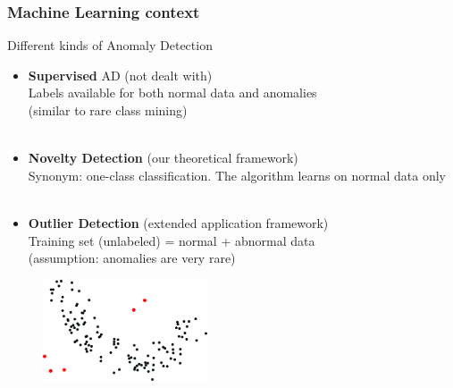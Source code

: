 \documentclass[9pt]{beamer}
\newcommand\red{\color{red} }
\begin{document}
\begin{frame}
\frametitle{Machine Learning context}
\begin{block}{Different kinds of Anomaly Detection}
\begin{itemize}
\item \textbf{Supervised} AD {\red (not dealt with)}\\
Labels available for both normal data and anomalies\\
(similar to rare class mining)\\~\\

\item \textbf{Novelty Detection} {\red (our theoretical framework)}\\
Synonym: one-class classification.
The algorithm learns on normal data only\\~\\

\item \textbf{Outlier Detection} {\red (extended application framework)}\\
Training set (unlabeled) = normal + abnormal data \\
(assumption: anomalies are very rare)
\end{itemize}
\end{block}
\begin{figure}
\includegraphics[height=3cm]{sourcefigs/AD_intro.pdf}
\end{figure}
\end{frame}
\end{document}
